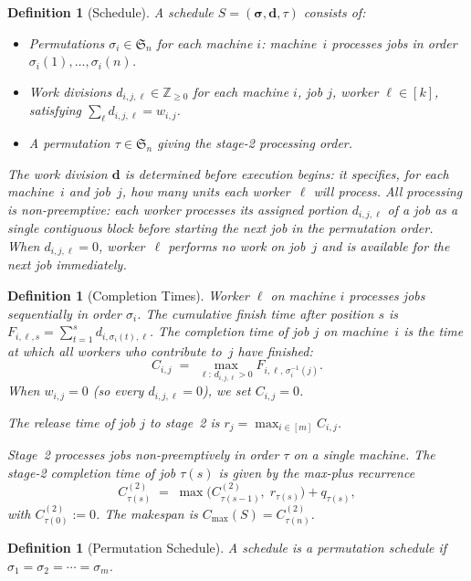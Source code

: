 \documentclass[11pt,titlepage]{article}
\newtheorem{definition}[theorem]{Definition}
\begin{document}
\begin{definition}[Schedule]
\label{def:schedule}
A schedule $S = (\boldsymbol{\sigma}, \mathbf{d}, \tau)$
consists of:
\begin{itemize}
  \item Permutations $\sigma_i \in \mathfrak{S}_n$ for each
        machine $i$: machine~$i$ processes jobs in order
        $\sigma_i(1), \ldots, \sigma_i(n)$.
  \item Work divisions $d_{i,j,\ell} \in \mathbb{Z}_{\geq 0}$
        for each machine $i$, job $j$, worker $\ell \in [k]$,
        satisfying $\sum_{\ell} d_{i,j,\ell} = w_{i,j}$.
  \item A permutation $\tau \in \mathfrak{S}_n$ giving the
        stage-2 processing order.
\end{itemize}
The work division $\mathbf{d}$ is determined \emph{before}
execution begins: it specifies, for each machine~$i$ and
job~$j$, how many units each worker~$\ell$ will process.
All processing is non-preemptive: each worker processes
its assigned portion $d_{i,j,\ell}$ of a job as a single
contiguous block before starting the next job in the
permutation order. When $d_{i,j,\ell} = 0$, worker~$\ell$
performs no work on job~$j$ and is available for the next
job immediately.
\end{definition}

\begin{definition}[Completion Times]
\label{def:completion}
Worker $\ell$ on machine $i$ processes jobs sequentially in
order $\sigma_i$. The cumulative finish time after position $s$
is $F_{i,\ell,s} = \sum_{t=1}^{s} d_{i,\sigma_i(t),\ell}$.
The \emph{completion time} of job $j$ on machine~$i$ is the
time at which all workers who contribute to~$j$ have finished:
\[
  C_{i,j} \;=\; \max_{\ell :\, d_{i,j,\ell} > 0}
  F_{i,\ell,\,\sigma_i^{-1}(j)}.
\]
When $w_{i,j} = 0$ (so every $d_{i,j,\ell} = 0$), we set
$C_{i,j} = 0$.

The \emph{release time} of job $j$ to stage~2 is
$r_j = \max_{i \in [m]} C_{i,j}$.

Stage~2 processes jobs non-preemptively in order $\tau$ on
a single machine. The stage-2 completion time of job
$\tau(s)$ is given by the max-plus recurrence
\[
  C^{(2)}_{\tau(s)} \;=\; \max\!\big(C^{(2)}_{\tau(s-1)},\;
  r_{\tau(s)}\big) + q_{\tau(s)},
\]
with $C^{(2)}_{\tau(0)} := 0$.
The makespan is $C_{\max}(S) = C^{(2)}_{\tau(n)}$.
\end{definition}

\begin{definition}[Permutation Schedule]
A schedule is a \emph{permutation schedule} if
$\sigma_1 = \sigma_2 = \cdots = \sigma_m$.
\end{definition}
\end{document}
